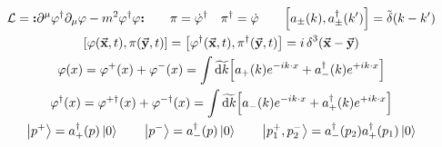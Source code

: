\begin{gather*}
        \Lc = \nord{\partial^\mu\varphi^\dagger\partial_\mu\varphi - m^2\varphi^\dagger\varphi}
        \qquad
        \pi = \dot{\varphi}^\dagger
        \quad
        \pi^\dagger = \dot{\varphi}
        \qquad
        \comm{a_\pm(k)}{a_\pm^\dagger(k')}
        = \Tdelta(k-k')
        \\
        \comm{\varphi(\va{x},t)}{\pi(\va{y},t)}
        = \comm{\varphi^\dagger(\va{x},t)}{\pi^\dagger(\va{y},t)}
        = i\Ddelta[3](\va{x}-\va{y})
        \\
        \varphi(x)
        = \varphi^+(x) + \varphi^-(x)
        = \int\Tdd{k} \qty[a_+(k)e^{-ik\cdot x} + a_-^\dagger(k)e^{+ik\cdot x}]
        \\
        \varphi^\dagger(x)
        = \varphi^{+\dagger}(x) + \varphi^{-\dagger}(x)
        = \int\Tdd{k} \qty[a_-(k)e^{-ik\cdot x} + a_+^\dagger(k)e^{+ik\cdot x}]
        \\
        \ket{p^+} = a_+^\dagger(p)\ket{0}
        \qquad
        \ket{p^-} = a_-^\dagger(p)\ket{0}
        \qquad
        \ket{p_1^+,p_2^-} = a_-^\dagger(p_2)a_+^\dagger(p_1)\ket{0}
\end{gather*}
